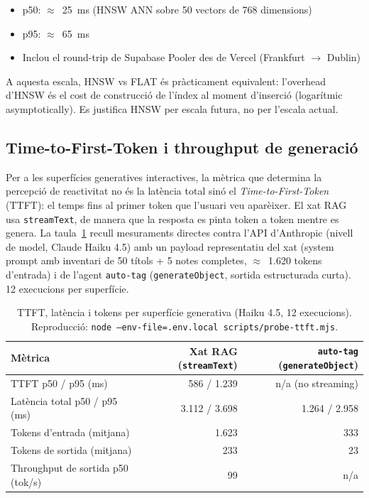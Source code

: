 \begin{itemize}
    \item p50: $\approx$~25~ms (HNSW ANN sobre 50 vectors de 768 dimensions)
    \item p95: $\approx$~65~ms
    \item Inclou el round-trip de Supabase Pooler des de Vercel (Frankfurt $\rightarrow$ Dublin)
\end{itemize}

A aquesta escala, HNSW vs FLAT és pràcticament equivalent: l'overhead d'HNSW és el cost de construcció de l'índex al moment d'inserció (logarítmic asymptotically). Es justifica HNSW per escala futura, no per l'escala actual.

\subsection{Time-to-First-Token i throughput de generació}
\label{sec:ttft}

Per a les superfícies generatives interactives, la mètrica que determina la percepció de reactivitat no és la latència total sinó el \emph{Time-to-First-Token} (TTFT): el temps fins al primer token que l'usuari veu aparèixer. El xat RAG usa \texttt{streamText}, de manera que la resposta es pinta token a token mentre es genera. La taula~\ref{tab:ttft} recull mesuraments directes contra l'API d'Anthropic (nivell de model, Claude Haiku 4.5) amb un payload representatiu del xat (system prompt amb inventari de 50 títols + 5 notes completes, $\approx$~1.620 tokens d'entrada) i de l'agent \texttt{auto-tag} (\texttt{generateObject}, sortida estructurada curta). 12 execucions per superfície.

\begin{table}[H]
    \centering
    \footnotesize
    \caption{TTFT, latència i tokens per superfície generativa (Haiku 4.5, 12 execucions). Reproducció: \texttt{node --env-file=.env.local scripts/probe-ttft.mjs}.}
    \label{tab:ttft}
    \begin{tabular}{@{}lrr@{}}
        \toprule
        Mètrica & Xat RAG (\texttt{streamText}) & \texttt{auto-tag} (\texttt{generateObject}) \\
        \midrule
        TTFT p50 / p95 (ms) & 586 / 1.239 & n/a (no streaming) \\
        Latència total p50 / p95 (ms) & 3.112 / 3.698 & 1.264 / 2.958 \\
        Tokens d'entrada (mitjana) & 1.623 & 333 \\
        Tokens de sortida (mitjana) & 233 & 23 \\
        Throughput de sortida p50 (tok/s) & 99 & n/a \\
        \bottomrule
    \end{tabular}
\end{table}

